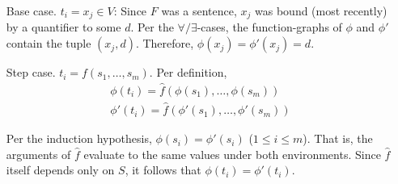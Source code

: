 \begin{itemize}
		\begin{itemize}
			\item[Base case.] $t_i = x_j \in V$: Since $F$ was a sentence, $x_j$ was bound (most recently) by a quantifier to some $d$. Per the $\forall/\exists$-cases, the function-graphs of $\phi$ and $\phi'$ contain the tuple $(x_j,d)$. Therefore, $\phi(x_j) = \phi'(x_j) = d$.
			
			\item[Step case.] $t_i = f(s_1,\dots,s_m)$. Per definition,
			$$
				\begin{array}{l}
					\phi(t_i) = \hat{f}(\phi(s_1),\dots,\phi(s_m))\\
					\phi'(t_i) = \hat{f}(\phi'(s_1),\dots,\phi'(s_m))
				\end{array}
			$$
			
			Per the induction hypothesis, $\phi(s_i) = \phi'(s_i)$ ($1 \leq i \leq m$). That is, the arguments of $\hat{f}$ evaluate to the same values under both environments. Since $\hat{f}$ itself depends only on $S$, it follows that $\phi(t_i) = \phi'(t_i)$.
		\end{itemize}
\end{itemize}


\setcounter{section}{4}

